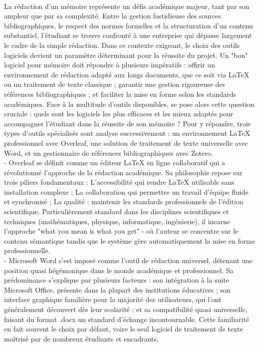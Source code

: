 \documentclass[]{article}
\begin{document}
\paragraph{}
La rédaction d'un mémoire représente un défis académique majeur, tant par son ampleur que par sa complexité. Entre la gestion fastidieuse des sources bibliographiques, le respect des normes formelles et la structuration d'un contenu substantiel, l'étudiant se trouve confronté à une entreprise qui dépasse largement le cadre de la simple rédaction. Dans ce contexte exigeant, le choix des outils logiciels devient un paramètre déterminant pour la réussite du projet. Un "bon" logiciel pour mémoire doit répondre à plusieurs impératifs : offirir un environnement de rédaction adapté aux longs documents, que ce soit via LaTeX ou un traitement de texte classique ; garantir une gestion rigoureuse des références bibliographiques ; et faciliter la mise en forme selon les standards académiques. Face à la multitude d'outils disponibles, se pose alors cette question cruciale : quels sont les logiciels les plus efficaces et les mieux adaptés pour accompagner l'étudiant dans la réussite de son mémoire ? Pour y répondre, trois types d'outils spécialisés sont analyse successivement : un environnement LaTeX professionnel avec Overleaf, une solution de traitement de texte universelle avec Word, et un gestionnaire de références bibliographiques avec Zotero.\\
- Overleaf se définit comme un éditeur LaTeX en ligne collaboratif qui a révolutionné l'approche de la rédaction académique. Sa philosophie repose sur trois piliers fondamentaux : L'accessibilité qui rendre LaTeX utilisable sans installation complexe ; La collaboration qui permettre un travail d'équipe fluide et synchronisé ; La qualité : maintenir les standards professionnels de l'édition scientifique. Particulièrement standard dans les disciplines scientifiques et techniques (mathématiques, physique, informatique, ingénierie), il incarne l'approche "what you mean is what you get" - où l'auteur se concentre sur le contenu sémantique tandis que le système gère automatiquement la mise en forme professionnelle.\\
- Microsoft Word s'est imposé comme l'outil de rédaction universel, détenant une position quasi hégémonique dans le monde académique et professionnel. Sa prédominance s'explique par plusieurs facteurs : son intégration à la suite Microsoft Office, présente dans la plupart des institutions éducatives ; son interface graphique familière pour la majorité des utilisateurs, qui l'ont généralement découvert dès leur scolarité ; et sa compatibilité quasi universelle, faisant du format .docx un standard d'échange incontournable. Cette familiarité en fait souvent le choix par défaut, voire le seul logiciel de traitement de texte maîtrisé par de nombreux étudiants et encadrants.\\
\end{document}
